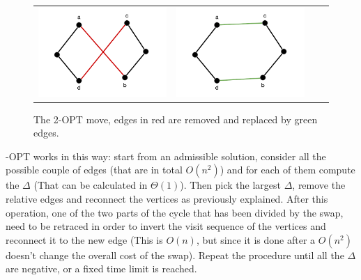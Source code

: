 \begin{figure}[h!]
\centering
	\begin{tabular}{@{}cccc@{}}
		\includegraphics[scale=0.6]{media/twopt1.pdf} &
		\includegraphics[scale=0.6]{media/twopt2.pdf} \\
	\end{tabular}
	\caption{The 2-OPT move, edges in red are removed and replaced by green edges.}
\end{figure}

-OPT works in this way: start from an admissible solution, consider all the possible couple of edges (that are in total $O(n^2)$) and for each of them compute the $\Delta$ (That can be calculated in $\Theta(1)$). Then pick the largest $\Delta$, remove the relative edges and reconnect the vertices as previously explained. After this operation, one of the two parts of the cycle that has been divided by the swap, need to be retraced in order to invert the visit sequence of the vertices and reconnect it to the new edge (This is $O(n)$, but since it is done after a $O(n^2)$ doesn't change the overall cost of the swap). Repeat the procedure until all the $\Delta$ are negative, or a fixed time limit is reached.\\

